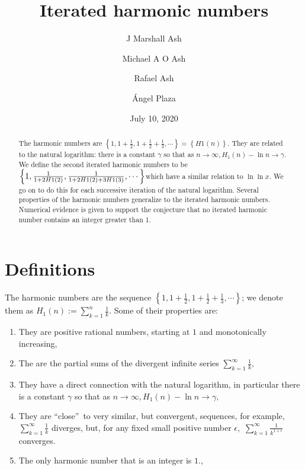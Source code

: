 \documentclass{article}
\begin{document}
\title{Iterated harmonic numbers}
\author{J Marshall Ash \and Michael A O Ash \and Rafael Ash \and \'{A}ngel
Plaza}
\date{July 10, 2020}
\maketitle

\begin{abstract}
The harmonic numbers are $\left\{ 1,1+\frac{1}{2},1+\frac{1}{2}+\frac{1}{3}%
,\cdots \right\} =\left\{ H1\left( n\right) \right\} $. They are related to
the natural logarithm: there is a constant $\gamma $ so that as $%
n\rightarrow \infty ,H_{1}\left( n\right) -\ln n\rightarrow \gamma .$ We
define the second iterated harmonic numbers to be $\left\{ 1,\frac{1}{%
1+2H1\left( 2\right) },\frac{1}{1+2H1\left( 2\right) +3H1\left( 3\right) }%
,\cdots \right\} $which have a similar relation to $\ln \ln x.$ We go on to
do this for each successive iteration of the natural logarithm. Several
properties of the harmonic numbers generalize to the iterated harmonic
numbers. Numerical evidence is given to support the conjecture that no
iterated harmonic number contains an integer greater than 1.
\end{abstract}

\section{Definitions}

The harmonic numbers are the sequence $\left\{ 1,1+\frac{1}{2},1+\frac{1}{2}+%
\frac{1}{3},\cdots \right\} $; we denote them as $H_{1}\left( n\right)
:=\sum_{k=1}^{n}\frac{1}{k}$. Some of their properties are:

\begin{enumerate}
\item They are positive rational numbers, starting at $1$ and monotonically
increasing,

\item The are the partial sums of the divergent infinite series $%
\sum_{k=1}^{\infty }\frac{1}{k},$

\item They have a direct connection with the natural logarithm, in
particular there is a constant $\gamma $ so that as $n\rightarrow \infty
,H_{1}\left( n\right) -\ln n\rightarrow \gamma ,$

\item They are \textquotedblleft close\textquotedblright\ to very similar,
but convergent, sequences, for example, $\sum_{k=1}^{\infty }\frac{1}{k}$
diverges, but, for any fixed small positive number $\epsilon ,$ $%
\sum_{k=1}^{\infty }\frac{1}{k^{1+\epsilon }}$ converges.

\item The only harmonic number that is an integer is $1$.,
\end{enumerate}
\end{document}
